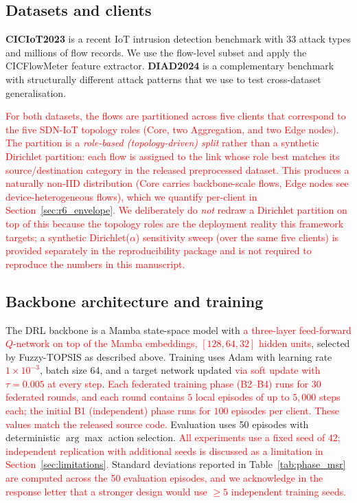 \documentclass[journal]{IEEEtran}
\newcommand{\rev}[1]{\textcolor{red}{#1}}
\begin{document}
\subsection{Datasets and clients}\label{sec:methods_data}

\textbf{CICIoT2023}\cite{ciciot2023} is a recent IoT intrusion detection
benchmark with 33 attack types and millions of flow records. We use the
flow-level subset and apply the CICFlowMeter feature
extractor\cite{sharafaldin2019cicflowmeter}. \textbf{DIAD2024}
\cite{diad2024} is a complementary benchmark with structurally different
attack patterns that we use to test cross-dataset generalisation.

\rev{For both datasets, the flows are partitioned across five clients that correspond to the five SDN-IoT topology roles (Core, two Aggregation, and two Edge nodes). The partition is a \emph{role-based (topology-driven) split} rather than a synthetic Dirichlet partition: each flow is assigned to the link whose role best matches its source/destination category in the released preprocessed dataset. This produces a naturally non-IID distribution (Core carries backbone-scale flows, Edge nodes see device-heterogeneous flows), which we quantify per-client in Section~\ref{sec:r6_envelope}. We deliberately do \emph{not} redraw a Dirichlet partition on top of this because the topology roles are the deployment reality this framework targets; a synthetic Dirichlet($\alpha$) sensitivity sweep (over the same five clients) is provided separately in the reproducibility package and is not required to reproduce the numbers in this manuscript.}

\subsection{Backbone architecture and training}\label{sec:methods_arch}

The DRL backbone is a Mamba state-space model\cite{gu2023mamba,
gu2022efficiently,dao2024mamba2} with \rev{a three-layer feed-forward $Q$-network on top of the Mamba embeddings, $[128, 64, 32]$ hidden units}, selected by Fuzzy-TOPSIS as described above. Training
uses Adam\cite{kingma2015adam} with learning rate \rev{$1\times 10^{-3}$},
batch size 64, and a target network updated \rev{via soft update with $\tau = 0.005$ at every step}. \rev{Each federated training phase (B2--B4) runs for $30$ federated rounds, and each round contains $5$ local episodes of up to $5{,}000$ steps each; the initial B1 (independent) phase runs for $100$ episodes per client. These values match the released source code.} Evaluation uses 50 episodes with deterministic
$\arg\max$ action selection. \rev{All experiments use a fixed seed of $42$; independent replication with additional seeds is discussed as a limitation in Section~\ref{sec:limitations}.} Standard deviations reported in
Table~\ref{tab:phase_msr} \rev{are computed across the 50 evaluation episodes, and we acknowledge in the response letter that a stronger design would use $\geq 5$ independent training seeds.}
\end{document}
